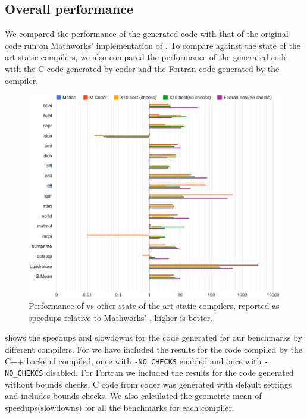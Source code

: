 \subsection{Overall \mixten performance}

We compared the performance of the generated \xten code with that of the
original \matlab code run on Mathworks' implementation of \matlab.  To compare
against the state of the art static compilers, we also compared the performance
of the \mixten generated \xten code with the C code generated by \matlab coder
and the Fortran code generated by the \mctwofor compiler.

\begin{figure}[htbp] 
\begin{center}
\includegraphics[width=\linewidth]{Figures/final/overall_perf.pdf}
\caption{Performance of \mixten vs other state-of-the-art static
compilers, reported as speedups relative to Mathworks' \matlab,  higher
is better.} \label{Fig:overall_perf} 
\end{center} 
\end{figure} 

 shows the speedups and slowdowns for the code
generated for our benchmarks by different compilers.  For \mixten we have
included the results for the \xten code compiled by the \xten C++ backend
compiled, once with \texttt{-NO\_CHECKS} enabled and once with
\texttt{-NO\_CHEKCS} disabled.  For Fortran we included the results for the
code generated without bounds checks.  C code from \matlab coder was generated
with default settings and includes bounds checks. We also calculated the
geometric mean of speedups(slowdowns) for all the benchmarks for each compiler. 

